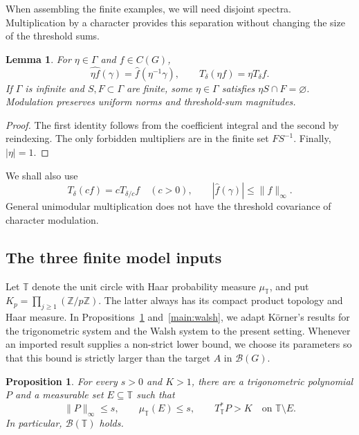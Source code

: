 \documentclass[11pt]{amsart}
\newtheorem{lemma}[theorem]{Lemma}
\newtheorem{proposition}[theorem]{Proposition}
\theoremstyle{definition}
\theoremstyle{remark}
\newcommand{\B}{\mathcal B}
\begin{document}
When assembling the finite examples, we will need disjoint spectra.
Multiplication by a character provides this separation without changing the
size of the threshold sums.

\begin{lemma}\label{main:modulation}
For \(\eta\in\Gamma\) and \(f\in C(G)\),
\[
 \widehat{\eta f}(\gamma)=\widehat f(\eta^{-1}\gamma),
 \qquad T_\delta(\eta f)=\eta T_\delta f.
\]
If \(\Gamma\) is infinite and \(S,F\subset\Gamma\) are finite,
some \(\eta\in\Gamma\) satisfies \(\eta S\cap F=\varnothing\).
Modulation preserves uniform norms and threshold-sum magnitudes.
\end{lemma}

\begin{proof}
The first identity follows from the coefficient integral and
the second by reindexing. The only forbidden multipliers are
in the finite set \(FS^{-1}\). Finally, \(|\eta|=1\).
\end{proof}

We shall also use
\begin{equation}\label{main:scaling}
 T_\delta(cf)=cT_{\delta/c}f\quad(c>0),\qquad
 |\widehat f(\gamma)|\leq\|f\|_\infty.
\end{equation}
General unimodular multiplication does not have the threshold
covariance of character modulation.

\subsection{The three finite model inputs}

Let \(\mathbb T\) denote the unit circle with Haar probability measure
\(\mu_{\mathbb T}\), and put \(K_p=\prod_{j\geq1}(\mathbb Z/p\mathbb Z)\).
The latter always has its compact product topology and Haar measure.
In Propositions~\ref{main:circle} and~\ref{main:walsh}, we adapt
K\"orner's results for the trigonometric system \cite{K99} and the
Walsh system \cite{K06} to the present setting.
Whenever an imported result supplies a non-strict lower bound,
we choose its parameters so that this bound is strictly larger
than the target \(A\) in \(\B(G)\).

\begin{proposition}\label{main:circle}
For every \(s>0\) and \(K>1\), there are a trigonometric polynomial
\(P\) and a measurable set \(E\subseteq\mathbb T\) such that
\[
 \|P\|_\infty\leq s,\qquad \mu_{\mathbb T}(E)\leq s,\qquad
 T^*_{\mathbb T}P>K\quad\text{on }\mathbb T\setminus E.
\]
In particular, \(\B(\mathbb T)\) holds.
\end{proposition}
\end{document}

